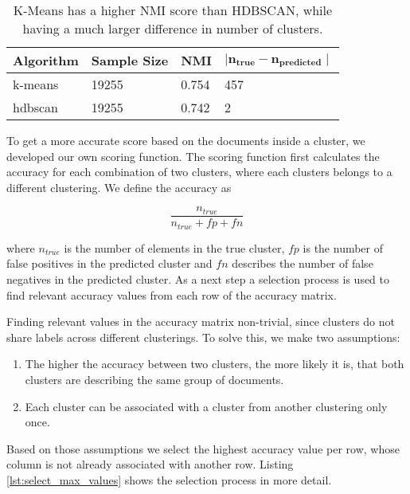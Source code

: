 
\begin{table}[h]
    \centering
    \begin{tabular}{|l|l|l|l|}
    \hline
    \textbf{Algorithm} & \textbf{Sample Size} & \textbf{NMI}  & $\mathbf{ \mid n_{true} - n_{predicted} \mid }$ \\ \hline
    k-means & 19255 & 0.754 & 457 \\ \hline
    hdbscan & 19255 & 0.742 & 2 \\ \hline
    \end{tabular}
    \caption{K-Means has a higher NMI score than HDBSCAN, while having a much larger difference in number of clusters.}
    \label{tab:nmi_kmeans_example}
\end{table}

To get a more accurate score based on the documents inside a cluster, we developed our own scoring function. The scoring function first calculates the accuracy for each combination of two clusters, where each clusters belongs to a different clustering. We define the accuracy as

\begin{equation}
    \label{equ:accuracy}
        \frac{n_{true}}{n_{true} + fp + fn}
    \end{equation}

where $n_{true}$ is the number of elements in the true cluster, $fp$ is the number of false positives in the predicted cluster and $fn$ describes the number of false negatives in the predicted cluster. As a next step a selection process is used to find relevant accuracy values from each row of the accuracy matrix. 

Finding relevant values in the accuracy matrix non-trivial, since clusters do not share labels across different clusterings. To solve this, we make two assumptions:
\begin{enumerate} 
\item The higher the accuracy between two clusters, the more likely it is, that both clusters are describing the same group of documents. 
\item Each cluster can be associated with a cluster from another clustering only once.
\end{enumerate}

Based on those assumptions we select the highest accuracy value per row, whose column is not already associated with another row. Listing \ref{lst:select_max_values} shows the selection process in more detail. 

